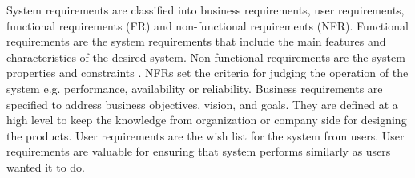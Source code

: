 System requirements are classified into business requirements, user
requirements, functional requirements (FR) and non-functional requirements (NFR). Functional
requirements are the system requirements that include the main features and
characteristics of the desired system. Non-functional requirements are the
system properties and constraints \cite{Davis:1993, Glinz}. NFRs set the
criteria for judging the operation of the system e.g.
performance, availability or reliability. Business requirements are specified to
address business objectives, vision, and goals. They are defined at a high level
to keep the knowledge from organization or company side for designing the products.
User requirements are the wish list for the system from users.
User requirements are valuable for ensuring that system performs similarly as users wanted it to do.
